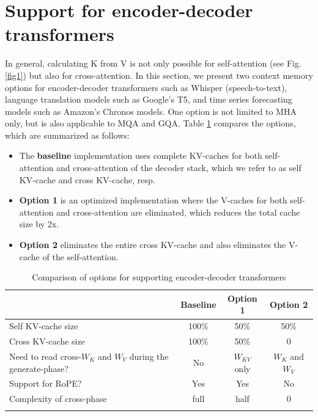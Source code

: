 \documentclass{article}
\def\fline{\Xhline{2\arrayrulewidth}}              %
\begin{document}
\section{Support for encoder-decoder transformers} \label{sec:enc-dec}
In general, calculating K from V is not only possible for self-attention (see Fig. \ref{fig1}) but also for cross-attention. In this section, we present two context memory options for encoder-decoder transformers such as Whisper (speech-to-text), language translation models such as Google’s T5, and time series forecasting models such as Amazon’s Chronos models. One option is not limited to MHA only, but is also applicable to MQA and GQA. Table \ref{tab6} compares the options, which are summarized as follows:
\begin{itemize}[topsep=-1pt]
  \item The \textbf{baseline} implementation uses complete KV-caches for both self-attention and cross-attention of the decoder stack, which we refer to as self KV-cache and cross KV-cache, resp.
  \item \textbf{Option 1} is an optimized implementation where the V-caches for both self-attention and cross-attention are eliminated, which reduces the total cache size by 2x.
  \item \textbf{Option 2} eliminates the entire cross KV-cache and also eliminates the V-cache of the self-attention.
\end{itemize}
\begin{table}[h!] \centering
  \caption{Comparison of options for supporting encoder-decoder transformers}
  \begin{tabular}{lccc} \fline
                             & Baseline & Option 1 & Option 2 \\ \hline
  Self KV-cache size         & 100\%    & 50\%     & 50\%     \\
  Cross KV-cache size        & 100\%    & 50\%     & 0        \\
  \makecell[l]{Need to read cross-$W_K$ and $W_V$ \\ during the generate-phase?} & No & $W_{KV}$ only & $W_K$ and $W_V$ \\
  Support for RoPE?          & Yes      & Yes      & No       \\
  Complexity of cross-phase  & full     & half     & 0        \\ \fline
\end{tabular} \label{tab6} \end{table}
\end{document}
